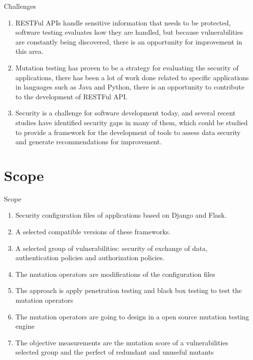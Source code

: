 \documentclass[10pt]{beamer}
\theoremstyle{remark}
\theoremstyle{definition}
\begin{document}
\begin{frame}{Challenges}
\begin{enumerate}
    \item RESTFul APIs handle sensitive information that needs to be protected, software testing evaluates how they are handled, but because vulnerabilities are constantly being discovered, there is an opportunity for improvement in this area.
    \item Mutation testing has proven to be a strategy for evaluating the security of applications, there has been a lot of work done related to specific applications in languages such as Java and Python, there is an opportunity to contribute to the development of RESTFul API.
    \item Security is a challenge for software development today, and several recent studies have identified security gaps in many of them, which could be studied to provide a framework for the development of tools to assess data security and generate recommendations for improvement.
\end{enumerate}
\end{frame}

\section{Scope}

\begin{frame}{Scope}
  \begin{enumerate}
    \item Security configuration files of applications based on Django and Flask.
    \item A selected compatible versions of these frameworks.
    \item A selected group of vulnerabilities: security of exchange of data, authentication policies and authorization policies. 
    \item The mutation operators are modifications of the configuration files
    \item The approach is apply penetration testing and black box testing to test the mutation operators
    \item The mutation operators are going to design in a open source mutation testing engine
    \item The objective measurements are the mutation score of a vulnerabilities selected group and the perfect of redundant and unuseful mutants
  \end{enumerate}

\end{frame}
\end{document}
